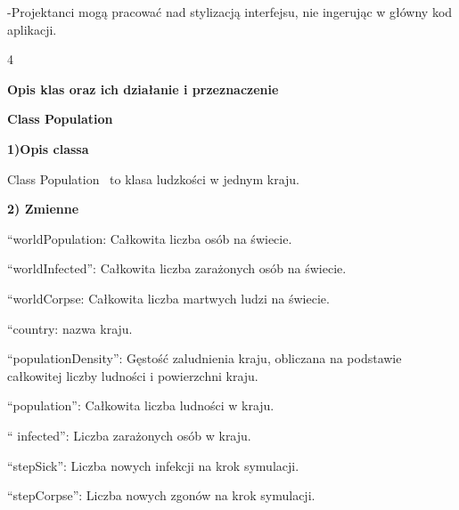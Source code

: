\documentclass[a4paper]{article}
\begin{document}
\foreignlanguage{polish}{{}-Projektanci mogą pracować nad stylizacją interfejsu, nie ingerując w główny kod aplikacji.}


\bigskip


\bigskip


\bigskip
\bigskip
\bigskip
\bigskip
\bigskip
\bigskip
\bigskip
\bigskip
\bigskip
\bigskip
\bigskip
\bigskip
\bigskip
\bigskip
\bigskip
\bigskip
\bigskip
\bigskip
\bigskip
\bigskip
\bigskip
\bigskip
\bigskip
\bigskip
\bigskip
\bigskip
\bigskip
\bigskip
\bigskip
\bigskip
\bigskip
\bigskip
\bigskip
\bigskip
\bigskip
\bigskip
\bigskip
\bigskip
\bigskip
\begin{center}
	4
\end{center}
\newpage
{\centering
\foreignlanguage{polish}{\textbf{Opis klas oraz ich działanie i przeznaczenie}}
\par}


\bigskip

{\centering
\foreignlanguage{polish}{\textbf{Class Population}}
\par}
\vspace{6pt}
\foreignlanguage{polish}{\textbf{1)Opis classa}}

\foreignlanguage{polish}{Class Population \ to klasa ludzkości w jednym kraju.}


\bigskip

\foreignlanguage{polish}{\textbf{2) Zmienne}}

\foreignlanguage{polish}{“worldPopulation{\textquotedbl}: Całkowita liczba osób na świecie.}

\foreignlanguage{polish}{“worldInfected”: Całkowita liczba zarażonych osób na świecie.}

\foreignlanguage{polish}{“worldCorpse{\textquotedbl}: Całkowita liczba martwych ludzi na świecie.}

\foreignlanguage{polish}{“country{\textquotedbl}: nazwa kraju.}

\foreignlanguage{polish}{“populationDensity”: Gęstość zaludnienia kraju, obliczana na podstawie całkowitej liczby
ludności i powierzchni kraju.}

\foreignlanguage{polish}{“population”: Całkowita liczba ludności w kraju.}

\foreignlanguage{polish}{“ infected”: Liczba zarażonych osób w kraju.}

\foreignlanguage{polish}{“stepSick”: Liczba nowych infekcji na krok symulacji.}

\foreignlanguage{polish}{“stepCorpse”: Liczba nowych zgonów na krok symulacji.}
\end{document}
